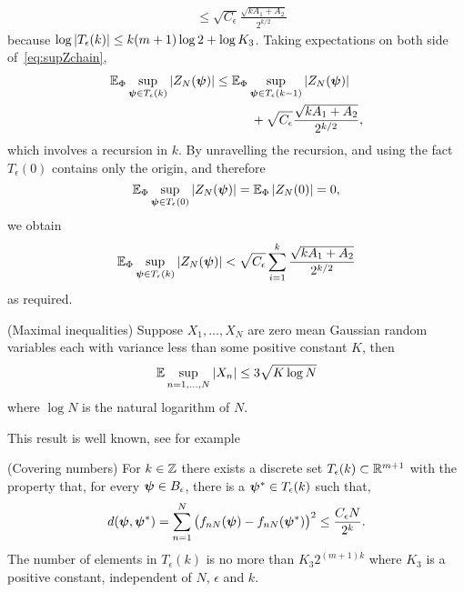 \documentclass[journal]{IEEEtran}
\begin{document}
\begin{IEEEproof}
\begin{align*}
&\leq \sqrt{C_\epsilon}\frac{\sqrt{  k A_1 + A_2 }}{2^{k/2}}
\end{align*}
because $\log\left\vert T_\epsilon(k) \right\vert \leq k(m+1)\log 2 +  \log K_3$.  Taking expectations on both side of~\eqref{eq:supZchain},
\begin{align*}
{\mathbb E}_{\Phi} \sup_{\boldsymbol{\psi} \in T_\epsilon(k) } \vert  Z_N(\boldsymbol{\psi})  \vert &\leq {\mathbb E}_{\Phi} \sup_{\boldsymbol{\psi} \in T_\epsilon(k-1)} \vert  Z_N(\boldsymbol{\psi})  \vert \\
&\hspace{1cm} + \sqrt{C_\epsilon}\frac{\sqrt{  k A_1 + A_2 }}{2^{k/2}},
\end{align*}
which involves a recursion in $k$.  By unravelling the recursion, and using the fact $T_\epsilon(0)$ contains only the origin, and therefore 
\[
{\mathbb E}_{\Phi}\sup_{\boldsymbol{\psi} \in T_\epsilon(0)} \left\vert  Z_N(\boldsymbol{\psi})  \right\vert = {\mathbb E}_{\Phi}\left\vert  Z_N(0)  \right\vert = 0,
\]
we obtain
\begin{align*}
{\mathbb E}_{\Phi} \sup_{\boldsymbol{\psi} \in T_\epsilon(k) } \left\vert  Z_N(\boldsymbol{\psi})  \right\vert < \sqrt{C_\epsilon} \sum_{i=1}^{k}\frac{\sqrt{  k A_1 + A_2 }}{2^{k/2}}
\end{align*}
as required.
\end{IEEEproof}

\begin{lemma}\label{lem:maxineq}(Maximal inequalities)
Suppose $X_1, \dots, X_N$ are zero mean Gaussian random variables each with variance less than some positive constant $K$, then
\[
{\mathbb E} \sup_{n = 1, \dots, N} \left\vert X_n \right\vert \leq 3  \sqrt{K \log N}
\]
where $\log N$ is the natural logarithm of $N$.
\end{lemma}
\begin{IEEEproof}
This result is well known, see for example~\cite[Section 3]{Pollard_asymp_empi_proc_1989}  
\end{IEEEproof}


\begin{lemma}\label{lem:metricentropy}(Covering numbers)
For $k \in {\mathbb Z}$ there exists a discrete set $T_\epsilon(k) \subset {\mathbb R}^{m+1}$ with the property that, for every $\boldsymbol{\psi} \in B_\epsilon$, there is a $\boldsymbol{\psi}^* \in T_\epsilon(k)$ such that,
\[
d(\boldsymbol{\psi},\boldsymbol{\psi}^*) = \sum_{n = 1}^N \big( f_{nN}(\boldsymbol{\psi}) - f_{nN}(\boldsymbol{\psi}^*) \big)^2 \leq \frac{C_\epsilon N}{2^k}.
\]
The number of elements in $T_\epsilon(k)$ is no more than $K_3 2^{(m+1)k}$ where $K_3$ is a positive constant, independent of $N$, $\epsilon$ and $k$.
\end{lemma}
\end{document}
